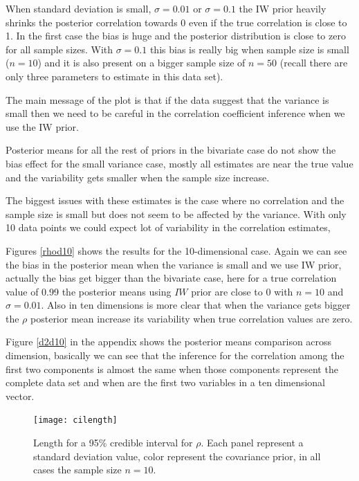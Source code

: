 \documentclass{article}
\begin{document}
When standard deviation is small, $\sigma=0.01$ or $\sigma=0.1$ the IW prior heavily shrinks the posterior correlation towards 0 even if the true correlation is close to 1. In the first case the bias is huge and the posterior distribution is close to zero for all sample sizes.  With $\sigma=0.1$ this bias is really big when sample size is small ($n=10$) and it is also present on a bigger sample size of $n=50$ (recall there are only three parameters to estimate in this data set). 

The main message of the plot is that if the data suggest that the variance is small then we need to be careful in the correlation coefficient inference when we use the IW prior. 

Posterior means for all the rest of priors in the bivariate case  do not show the bias effect for the small variance case, mostly all estimates are near the true value and the variability gets smaller when the sample size increase.  

The biggest issues with these estimates is the case where no correlation and the sample size is small but does not seem to be affected by the variance.  With only 10 data points we could expect lot of variability in the correlation estimates,

Figures \ref{rhod10}  shows the results for the 10-dimensional case. Again we can see the bias in the posterior mean when the variance is small and we use IW prior, actually the bias get bigger than the bivariate case, here for a true correlation value of 0.99 the posterior means using $IW$ prior are close to 0 with  $n=10$ and $\sigma=0.01$. Also in ten dimensions is more clear that when the variance gets bigger the $\rho$ posterior mean increase its variability when true correlation values are zero.

Figure \ref{d2d10} in the appendix shows the posterior means comparison across dimension, basically we can see that the inference for the correlation among the first two components is almost the same when those components represent the complete data set and when are the first two variables  in a ten dimensional vector. 

\begin{figure}[htbp]
   \centering
   \texttt{[image: cilength]} %
    \vspace{-.5in}
   \caption{Length for a 95\% credible interval for $\rho$. Each panel represent a standard deviation value,  color represent the covariance prior, in all cases the sample size $n=10$.  \label{cilength} }
\end{figure}
\end{document}
